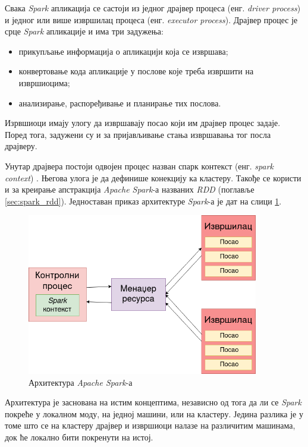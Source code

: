\documentclass[12pt,oneside]{memoir}
\begin{document}
Свака \textit{Spark} апликација се састоји из једног драјвер процеса (енг. \textit{driver process}) и једног или више извршилац процеса (енг. \textit{executor process}). Драјвер процес је срце \textit{Spark} апликације и има три задужења:

\begin{itemize}
	\item прикупљање информација о апликацији која се извршава;	
	\item конвертовање кода апликације у послове које треба извршити на извршиоцима;
	\item анализирање, распоређивање и планирање тих послова.
\end{itemize}

Изрвшиоци имају улогу да извршавају посао који им драјвер процес задаје. Поред тога, задужени су и за пријављивање стања извршавања тог посла драјверу. 

Унутар драјвера постоји одвојен процес назван спарк контекст (енг. \textit{spark context}) \cite{spark_guide}. Његова улога је да дефинише конекцију ка кластеру. Такође се користи и за креирање апстракција \textit{Apache Spark}-а названих \textit{RDD} (поглавље \ref{sec:spark_rdd}). Једноставан приказ архитектуре \textit{Spark}-а је дат на слици \ref{fig:spark_arhtt}.

\begin{figure}[!ht]
  \centering
  \includegraphics[width=0.90\textwidth]{pictures/spark_arch.png}
  \caption{Архитектура \textit{Apache Spark}-а}
  \label{fig:spark_arhtt}
\end{figure}

Архитектура је заснована на истим концептима, независно од тога да ли се \textit{Spark} покреће у локалном моду, на једној машини, или на кластеру. Једина разлика је у томе што се на кластеру драјвер и извршиоци налазе на различитим машинама, док ће локално бити покренути на истој.
\end{document}
